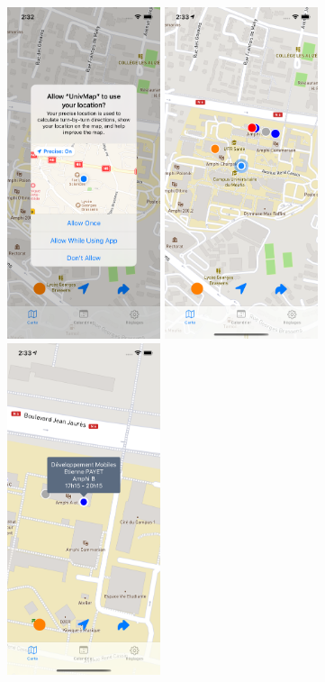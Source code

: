 \documentclass{article}
\begin{document}
\begin{center}
    \includegraphics[width=45mm, scale=0.5]{allowUserLocation.png}
    \includegraphics[width=45mm, scale=0.5]{map.png}
    \includegraphics[width=45mm, scale=0.5]{point_bleu.png}
\end{center}
\end{document}
